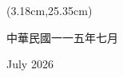 \begin{titlepage}
\begin{textblock*}{\textwidth}(3.18cm,25.35cm)
\begin{center}
{\fontsize{18}{24}\selectfont
中\hspace{0.35em}華\hspace{0.35em}民\hspace{0.35em}國\hspace{0.35em}一一五\hspace{0.35em}年\hspace{0.35em}七\hspace{0.35em}月\par
July 2026\par}
\end{center}
\end{textblock*}

\mbox{}
\end{titlepage}

\restoregeometry
